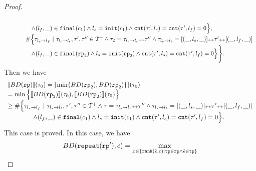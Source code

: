 \begin{proof}
\[\begin{array}{l}
        \\ \qquad \qquad
      \land (l_{f}, \_) \in \mathtt{final}(c_1)
      \land l_s = \mathtt{init}(c_1)
      \land \mathtt{cnt}(\mathtt{\tau}', l_s) = \mathtt{cnt}(\mathtt{\tau}', l_f) = 0 
      \Big\},
      \\ \qquad \quad
      \#
      \Big\{\mathtt{\tau}_{l_s \to l_f} ~\vert~ \mathtt{\tau}_{l_s \to l_t}, \mathtt{\tau}', \mathtt{\tau}''\in \mathcal{T}^{+}
      \land \mathtt{\tau}_2 = \mathtt{\tau}_{l_s \to l_t} {\scriptscriptstyle ++} \mathtt{\tau}''
      \land \mathtt{\tau}_{l_s \to l_t} = [(\_, l_s, \_)] {\scriptscriptstyle ++} \mathtt{\tau}' {\scriptscriptstyle ++} [(\_, l_f, \_)]
       \\ \qquad \qquad
     \land (l_{f}, \_) \in \mathtt{final}(\mathtt{rp}_2)
     \land l_s = \mathtt{init}(\mathtt{rp}_2)
     \land \mathtt{cnt}(\mathtt{\tau}', l_s) = \mathtt{cnt}(\mathtt{\tau}', l_f) = 0 
     \Big\} 
     \Bigg\}.
      \end{array}
    \]
    Then we have
    \[
      \begin{array}{l}
      \llbracket BD(\mathtt{rp}) \rrbracket(\mathtt{\tau}_0) =
      \llbracket \min \{ BD(\mathtt{rp}_2), BD(\mathtt{rp}_2) \} \rrbracket(\mathtt{\tau}_0)
      \\
      = \min \Big\{ \llbracket BD(\mathtt{rp}_2) \rrbracket(\mathtt{\tau}_0), \llbracket BD(\mathtt{rp}_2) \rrbracket(\mathtt{\tau}_0) \Big\}
      \\
      \geq
      \# \Big\{\mathtt{\tau}_{l_s \to l_f} ~\vert~ \mathtt{\tau}_{l_s \to l_t}, \mathtt{\tau}', \mathtt{\tau}''\in \mathcal{T}^{+}
      \land \mathtt{\tau} = \mathtt{\tau}_{l_s \to l_t} {\scriptscriptstyle ++} \mathtt{\tau}''
      \land \mathtt{\tau}_{l_s \to l_t} = [(\_, l_s, \_)] {\scriptscriptstyle ++} \mathtt{\tau}' {\scriptscriptstyle ++} [(\_, l_f, \_)]
      \\ \qquad \qquad
      \land (l_{f}, \_) \in \mathtt{final}(c_1)
      \land l_s = \mathtt{init}(c_1)
      \land \mathtt{cnt}(\mathtt{\tau}', l_s) = \mathtt{cnt}(\mathtt{\tau}', l_f) = 0 
      \Big\}.
        \end{array}
    \]
This case is proved.
In this case, we have
\[
  BD(\rprepeat(\rprog'), c) =
  \max\limits_{x \in \left\{ \locbound(\absevent, c) | \tpath \in \rprog \land \absevent \in \tpath \right\}}
\]
\end{proof}
